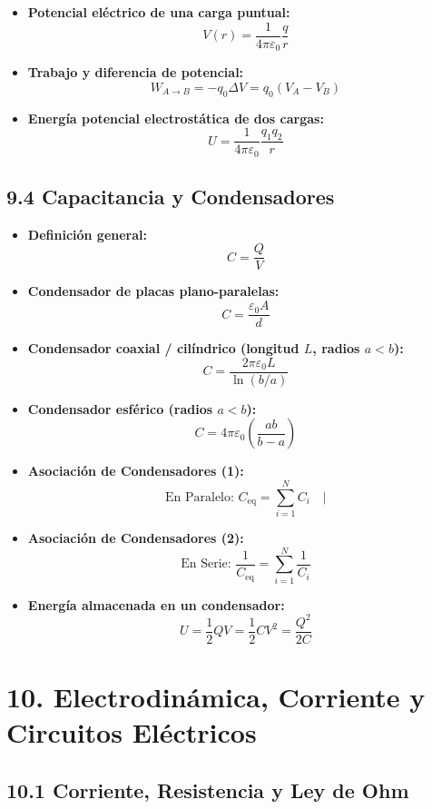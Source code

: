 \documentclass[11pt,a4paper]{article}
\begin{document}
\begin{itemize}
  \item \textbf{Potencial eléctrico de una carga puntual:}
  \[
    V(r) = \frac{1}{4\pi\varepsilon_0} \frac{q}{r}
  \]
  \item \textbf{Trabajo y diferencia de potencial:}
  \[
    W_{A \to B} = -q_0 \Delta V = q_0 (V_A - V_B)
  \]
  \item \textbf{Energía potencial electrostática de dos cargas:}
  \[
    U = \frac{1}{4\pi\varepsilon_0} \frac{q_1 q_2}{r}
  \]
\end{itemize}

\subsection*{9.4 Capacitancia y Condensadores}

\begin{itemize}
  \item \textbf{Definición general:}
  \[
    C = \frac{Q}{V}
  \]
  \item \textbf{Condensador de placas plano-paralelas:}
  \[
    C = \frac{\varepsilon_0 A}{d}
  \]
  \item \textbf{Condensador coaxial / cilíndrico (longitud $L$, radios $a < b$):}
  \[
    C = \frac{2\pi\varepsilon_0 L}{\ln(b/a)}
  \]
  \item \textbf{Condensador esférico (radios $a < b$):}
  \[
    C = 4\pi\varepsilon_0 \left( \frac{a b}{b - a} \right)
  \]
  \item \textbf{Asociación de Condensadores (1):}
  \[
    \text{En Paralelo: } C_{\mathrm{eq}} = \sum_{i=1}^N C_i \quad |
  \]
  \item \textbf{Asociación de Condensadores (2):}
  \[
    \text{En Serie: } \frac{1}{C_{\mathrm{eq}}} = \sum_{i=1}^N \frac{1}{C_i}
  \]
  \item \textbf{Energía almacenada en un condensador:}
  \[
    U = \frac{1}{2} Q V = \frac{1}{2} C V^2 = \frac{Q^2}{2C}
  \]
\end{itemize}

\section*{10. Electrodinámica, Corriente y Circuitos Eléctricos}

\subsection*{10.1 Corriente, Resistencia y Ley de Ohm}
\end{document}

